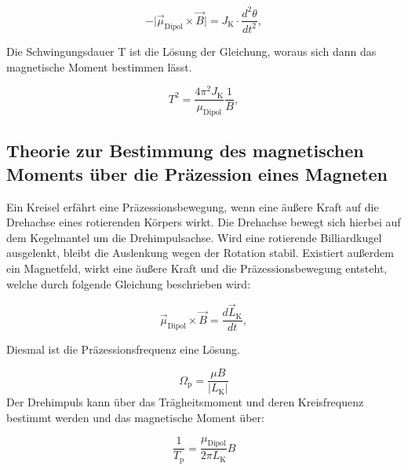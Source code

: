 \begin{equation}
    - \bigl|\vec{\mu}_\text{Dipol} \times \vec{B}\bigr| = J_\text{K} \cdot \frac{d^2\theta}{dt^2} ,
\end{equation}

Die Schwingungsdauer T ist die Lösung der Gleichung, woraus sich dann das magnetische Moment bestimmen lässt.

 \begin{equation}
   T^2 = \frac{4\pi^2 J_\text{K}}{\mu_\text{Dipol}} \frac{1}{B},
\end{equation}

\subsection{Theorie zur Bestimmung des magnetischen Moments über die Präzession eines Magneten}
Ein Kreisel erfährt eine Präzessionsbewegung, wenn eine äußere Kraft auf die Drehachse eines rotierenden Körpers wirkt.
Die Drehachse bewegt sich hierbei auf dem Kegelmantel um die Drehimpulsachse.
Wird eine rotierende Billiardkugel ausgelenkt, bleibt die Auslenkung wegen der Rotation stabil.
Existiert außerdem ein Magnetfeld, wirkt eine äußere Kraft und die Präzessionsbewegung entsteht, welche durch folgende Gleichung beschrieben wird:

\begin{equation}
    \vec{\mu}_\text{Dipol} \times \vec{B} = \frac{d\vec{L}_\text{K}}{dt} ,
\end{equation}

Diesmal ist die Präzessionsfrequenz eine Lösung. 

\begin{equation}
\Omega_\text{p} = \frac{\mu B}{\bigl|L_\text{K}\bigr|}
\end{equation}
Der Drehimpuls kann über das Trägheitsmoment und deren Kreisfrequenz bestimmt werden und das magnetische Moment über:

\begin{equation}
\frac{1}{T_\text{p}} = \frac{\mu_\text{Dipol}}{2\pi L_\text{K}} B
\end{equation}
